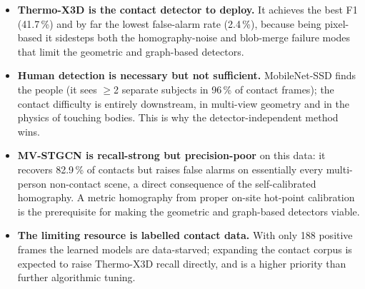 \documentclass[11pt, a4paper]{article}
\begin{document}
\begin{itemize}[leftmargin=2em]
    \item \textbf{Thermo-X3D is the contact detector to deploy.} It achieves the
        best F1 (41.7\,\%) and by far the lowest false-alarm rate (2.4\,\%),
        because being pixel-based it sidesteps both the homography-noise and
        blob-merge failure modes that limit the geometric and graph-based
        detectors.
    \item \textbf{Human detection is necessary but not sufficient.} MobileNet-SSD
        finds the people (it sees $\ge$2 separate subjects in 96\,\% of contact
        frames); the contact difficulty is entirely downstream, in multi-view
        geometry and in the physics of touching bodies. This is why the
        detector-independent method wins.
    \item \textbf{MV-STGCN is recall-strong but precision-poor} on this data: it
        recovers 82.9\,\% of contacts but raises false alarms on essentially
        every multi-person non-contact scene, a direct consequence of the
        self-calibrated homography. A metric homography from proper on-site
        hot-point calibration is the prerequisite for making the geometric and
        graph-based detectors viable.
    \item \textbf{The limiting resource is labelled contact data.} With only 188
        positive frames the learned models are data-starved; expanding the
        contact corpus is expected to raise Thermo-X3D recall directly, and is a
        higher priority than further algorithmic tuning.
\end{itemize}
\end{document}
